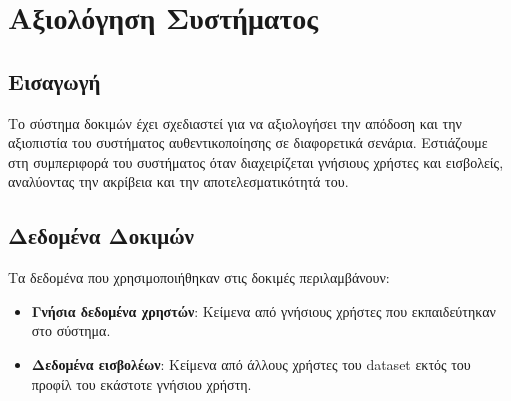\section{Αξιολόγηση Συστήματος}
\label{sec:exmperiments_metrics}

\subsection{Εισαγωγή}
Το σύστημα δοκιμών έχει σχεδιαστεί για να αξιολογήσει την απόδοση και την αξιοπιστία του συστήματος αυθεντικοποίησης σε διαφορετικά σενάρια. Εστιάζουμε στη συμπεριφορά του συστήματος όταν διαχειρίζεται γνήσιους χρήστες και εισβολείς, αναλύοντας την ακρίβεια και την αποτελεσματικότητά του.

\subsection{Δεδομένα Δοκιμών}
Τα δεδομένα που χρησιμοποιήθηκαν στις δοκιμές περιλαμβάνουν:
\begin{itemize}
    \item \textbf{Γνήσια δεδομένα χρηστών}: Κείμενα από γνήσιους χρήστες που εκπαιδεύτηκαν στο σύστημα.
    \item \textbf{Δεδομένα εισβολέων}: Κείμενα από άλλους χρήστες του dataset εκτός του προφίλ του εκάστοτε γνήσιου χρήστη.
\end{itemize}

